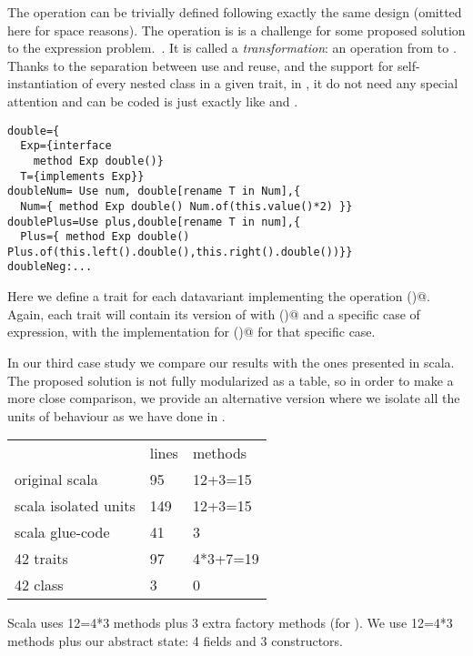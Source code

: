 The \Q@show@ operation can be trivially defined
following exactly the same design (omitted here for space reasons).
The operation \Q@double@ is is a challenge for some proposed solution to the expression problem.~\cite{}.
It is called a \emph{transformation}: an operation from \Q@Exp@ to \Q@Exp@.
Thanks to the separation between use and reuse, and the support
for self-instantiation of every nested class in a given trait,
in \name, it do not need any special attention
and can be coded is just exactly like \Q@eval@ and \Q@show@.
\begin{lstlisting}
double={
  Exp={interface
    method Exp double()}
  T={implements Exp}}
doubleNum= Use num, double[rename T in Num],{
  Num={ method Exp double() Num.of(this.value()*2) }}
doublePlus=Use plus,double[rename T in num],{
  Plus={ method Exp double() Plus.of(this.left().double(),this.right().double())}}
doubleNeg:...
\end{lstlisting}
Here we define a trait for each datavariant implementing the operation \Q@double()@.
Again, each trait will contain its version of \Q@Exp@ with \Q@double()@
and a specific case of expression, with the implementation for \Q@double()@
for that specific case.

In our third case study we compare our results with the ones presented
in scala.~\cite{}
The proposed solution is not fully modularized as a table,
so in order to make a more close comparison, we provide an alternative
version where we isolate all the units of behaviour as we
have done in \name.
\begin{minipage}{0.4\textwidth}
\begin{tabular}{l |l |l}
&                              lines  &   methods\\
original scala          & 95     &  12+3=15\\
scala  isolated units   & 149    &  12+3=15\\
scala  glue-code        &   41   &     3\\
42 traits               &   97   &    4*3+7=19\\
42 class                &   3    &     0\\
\end{tabular}
\end{minipage}
\begin{minipage}{0.6\textwidth}
Scala uses 12=4*3 methods plus 3 extra factory methods (for \Q@double@).
We use 12=4*3 methods plus our abstract state: 4 fields and 3 constructors.

\end{minipage}

